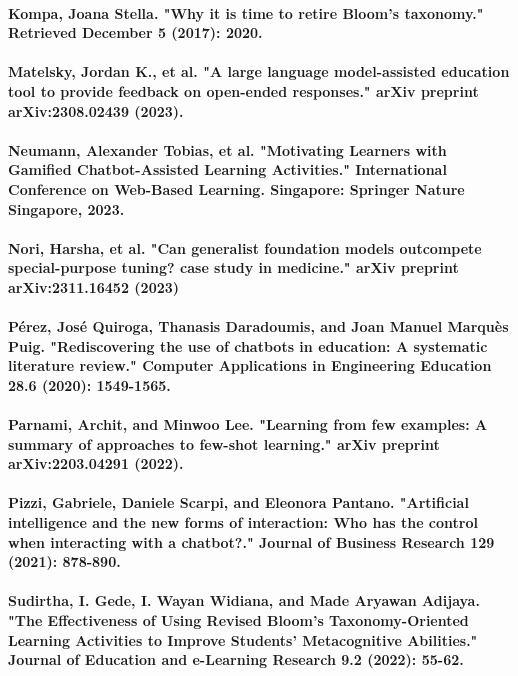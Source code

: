 \documentclass{article}
\begin{document}
\paragraph{Kompa, Joana Stella. "Why it is time to retire Bloom’s taxonomy." Retrieved December 5 (2017): 2020.}
\paragraph{Matelsky, Jordan K., et al. "A large language model-assisted education tool to provide feedback on open-ended responses." arXiv preprint arXiv:2308.02439 (2023).}
\paragraph{Neumann, Alexander Tobias, et al. "Motivating Learners with Gamified Chatbot-Assisted Learning Activities." International Conference on Web-Based Learning. Singapore: Springer Nature Singapore, 2023.}
\paragraph{Nori, Harsha, et al. "Can generalist foundation models outcompete special-purpose tuning? case study in medicine." arXiv preprint arXiv:2311.16452 (2023)}
\paragraph{Pérez, José Quiroga, Thanasis Daradoumis, and Joan Manuel Marquès Puig. "Rediscovering the use of chatbots in education: A systematic literature review." Computer Applications in Engineering Education 28.6 (2020): 1549-1565.}
\paragraph{Parnami, Archit, and Minwoo Lee. "Learning from few examples: A summary of approaches to few-shot learning." arXiv preprint arXiv:2203.04291 (2022).}
\paragraph{Pizzi, Gabriele, Daniele Scarpi, and Eleonora Pantano. "Artificial intelligence and the new forms of interaction: Who has the control when interacting with a chatbot?." Journal of Business Research 129 (2021): 878-890.}
\paragraph{Sudirtha, I. Gede, I. Wayan Widiana, and Made Aryawan Adijaya. "The Effectiveness of Using Revised Bloom's Taxonomy-Oriented Learning Activities to Improve Students' Metacognitive Abilities." Journal of Education and e-Learning Research 9.2 (2022): 55-62.}
\end{document}
